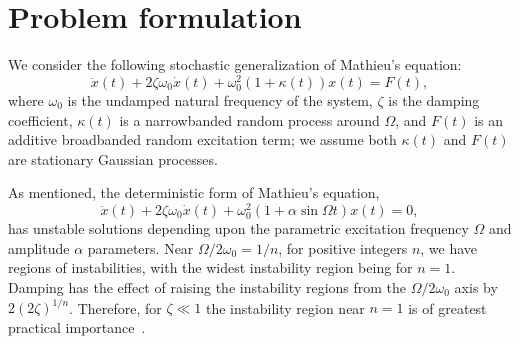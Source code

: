 \documentclass[3p]{elsarticle}
\begin{document}
\section{Problem formulation}\label{sec:prob_def}


We consider the following stochastic generalization of   Mathieu's equation:
\begin{equation}\label{eq:canonical_stoch_Mathieu}
    \ddot x(t) + 2 \zeta \omega_0 \dot x(t) +  \omega_0^2( 1  +  \kappa(t) )  x(t) =   F(t),
\end{equation}
where  $\omega_0$ is  the undamped natural frequency of the system, $\zeta$ is the damping coefficient,  $\kappa(t)$ is a   narrowbanded  random process around $\Omega$, and   $F(t)$ is an additive  broadbanded    random excitation term; we assume both $\kappa(t)$ and $F(t)$ are stationary Gaussian processes.

As mentioned, the deterministic form of Mathieu's equation,
\begin{equation}\label{eq:Mathieu_det}
    \ddot x(t) + 2   \zeta \omega_0 \dot x(t) + \omega_0^2( 1 + \alpha \sin \Omega t )  x(t) =  0 ,
\end{equation}
has unstable solutions  depending upon  the parametric excitation frequency $\Omega$ and amplitude $\alpha$ parameters. Near $\Omega/ 2 \omega_0 = 1/n$, for positive integers $n$, we have regions of instabilities, with the widest instability region being for $n=1$. Damping has the effect of raising the instability regions from the $\Omega/ 2 \omega_0$ axis by $2 (2\zeta)^{1/n}$. Therefore, for $\zeta \ll 1$ the instability region near $n=1$ is of greatest practical importance~\cite{Lin_Cai95,nayfeh_mook}. 
\end{document}
